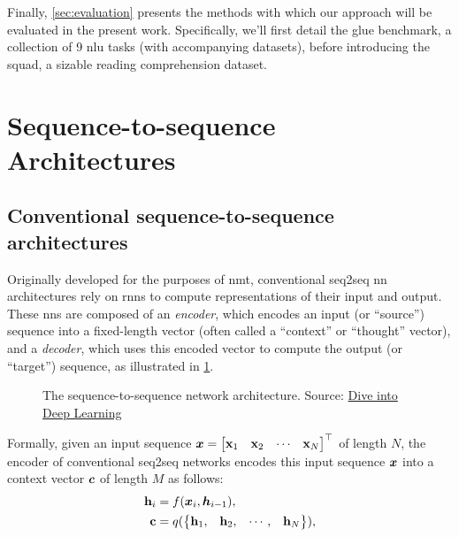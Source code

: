 Finally, \cref{sec:evaluation} presents the methods with which our approach will be evaluated in the present work. Specifically, we'll first detail the \gls{glue} benchmark, a collection of 9 \gls{nlu} tasks (with accompanying datasets), before introducing the \gls{squad}, a sizable reading comprehension dataset.



\section{Sequence-to-sequence Architectures}
\label{sec:seq2seq_architectures}

\subsection{Conventional sequence-to-sequence architectures}

Originally developed for the purposes of \gls{nmt}, conventional \gls{seq2seq} \gls{nn} architectures \citep{sutskever2014sequence,cho2014learning} rely on \glspl{rnn} to compute representations of their input and output. These \glspl{nn} are composed of an \emph{encoder}, which encodes an input (or ``source'') sequence into a fixed-length vector (often called a ``context'' or ``thought'' vector), and a \emph{decoder}, which uses this encoded vector to compute the output (or ``target'') sequence, as illustrated in \cref{fig:seq2seq_model_architecture}.

\begin{figure}[ht!]
    \centering
    \def\svgscale{0.8}
    
    \caption[The seq2seq network architecture]{The sequence-to-sequence network architecture. Source: \href{https://d2l.ai/chapter_recurrent-modern/seq2seq.html}{Dive into Deep Learning}}
    \label{fig:seq2seq_model_architecture}
\end{figure}

Formally, given an input sequence $\xvect = \begin{bmatrix} \xvect_1 & \xvect_2 & \cdots & \xvect_N \end{bmatrix}^{\top}$ of length $N$, the encoder of conventional \gls{seq2seq} networks encodes this input sequence $\xvect$ into a context vector $\cvect$ of length $M$ as follows:
\begin{align}
    \hvect_i &= f(\xvect_i, \hvect_{i-1}), \\
    \cvect &= q(\begin{Bmatrix} \hvect_1, & \hvect_2, & \cdots, & \hvect_N \end{Bmatrix}),
\end{align}

